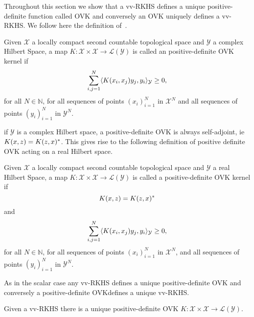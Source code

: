 Throughout this section we show that a \ac{vv-RKHS} defines a unique
positive-definite function called \acf{OVK} and conversely an \ac{OVK} uniquely
defines a \ac{vv-RKHS}. We follow here the definition of~\citet{Carmeli2010}.
\begin{definition}
    \label{def:reproducing_kernel}
    Given $\mathcal{X}$ a locally compact second countable topological space
    and  $\mathcal{Y}$ a complex Hilbert Space, a map
    $K:\mathcal{X}\times\mathcal{X}\to\mathcal{L}(\mathcal{Y})$ is called an
    positive-definite \acl{OVK} kernel if
    \begin{dmath}
        \sum_{i,j=1}^N\inner{K(x_i,x_j)y_j,y_i}_{\mathcal{Y}}\ge 0,
    \end{dmath}
    for all $N\in\mathbb{N}$, for all sequences of points $(x_i)_{i=1}^N$ in
    $\mathcal{X}^N$ and all sequences of points $(y_i)_{i=1}^N$ in
    $\mathcal{Y}^N$. \label{def:ovk}
\end{definition}
if $\mathcal{Y}$ is a complex Hilbert space, a positive-definite \acl{OVK} is
always self-adjoint, \acs{ie}~$K(x,z)=K(z,x)^*$. This gives rise to the
following definition of positive definite \acl{OVK} acting on a real Hilbert
space.
\begin{definition}
    \label{def:reproducing_kernel_real} Given $\mathcal{X}$ a locally compact
    second countable topological space and $\mathcal{Y}$ a real Hilbert Space,
    a map $K:\mathcal{X}\times\mathcal{X}\to\mathcal{L}(\mathcal{Y})$ is called
    a positive-definite \acl{OVK} kernel if
    \begin{dmath}
        K(x,z)=K(z,x)^\adjoint
    \end{dmath}
    and
    \begin{dmath}
        \sum_{i,j=1}^N\inner{K(x_i,x_j)y_j,y_i}_{\mathcal{Y}}\ge 0,
    \end{dmath}
    for all $N\in\mathbb{N}$, for all sequences of points $(x_i)_{i=1}^N$ in
    $\mathcal{X}^N$, and all sequences of points  $(y_i)_{i=1}^N$ in
    $\mathcal{Y}^N$. \label{def:ovk_real}
\end{definition}
As in the scalar case any \acl{vv-RKHS} defines a unique positive-definite
\acl{OVK} and conversely a positive-definite \acl{OVK}defines a unique
\acl{vv-RKHS}.
\begin{proposition}
    \label{pr:unique_rkhs} Given a \acl{vv-RKHS} there is a unique
    positive-definite \acl{OVK}
    $K:\mathcal{X}\times\mathcal{X}\to\mathcal{L}(\mathcal{Y})$.
\end{proposition}
